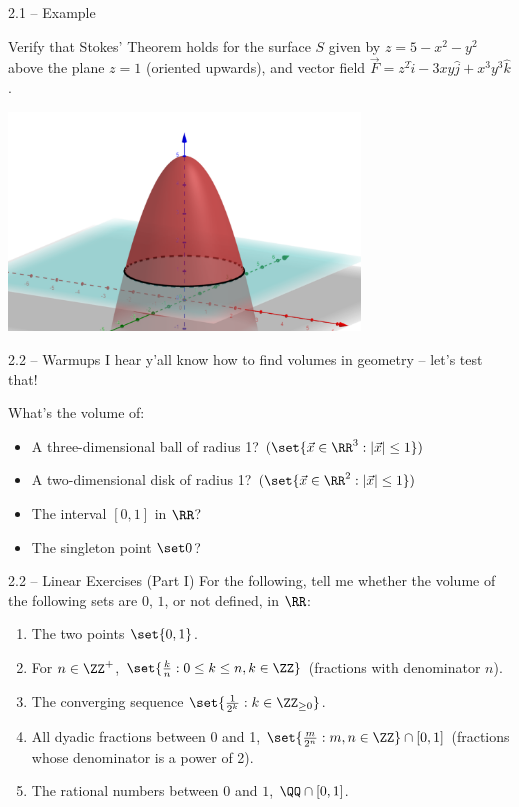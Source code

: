 \documentclass{beamer}
\theoremstyle{plain}
\begin{document}
\begin{frame}{2.1 -- Example}
\begin{problem}
  Verify that Stokes' Theorem holds for the surface $S$ given by $z = 5 - x^2 -
  y^2$ above the plane $z = 1$ (oriented upwards), and vector field $\vec F =
  z^2 \hat i - 3xy \hat j + x^3 y^3 \hat k$. 
\end{problem} 

\begin{center}
  \includegraphics[width=0.7\textwidth]{surface-example.png}
\end{center}
\end{frame}


\begin{frame}{2.2 -- Warmups}
 I hear y'all know how to find volumes in geometry -- let's test that!
 
What's the volume of: 
 \begin{itemize}
\pause
   \item A three-dimensional ball of radius 1? $(\set{\vec
    x \in \RR^3 : |\vec x| \leq 1})$
  \pause
  \item A two-dimensional disk of radius 1? $(\set{\vec x \in \RR^2 : |\vec x|
    \leq 1})$
  \pause
  \item The interval $[0,1]$ in $\RR$?  
  \pause
  \item The singleton point $\set 0$?
 \end{itemize}
\end{frame}

\begin{frame}{2.2 -- Linear Exercises (Part I)}
  For the following, tell me whether the volume of the following sets are $0$,
  $1$, or not defined, in $\RR$: 
  \begin{enumerate}
    \pause
    \item The two points $\set{0, 1}$. 
  \pause
    \item For $n \in \ZZ^+$, $\set{\frac k n : 0 \leq k \leq n, k \in
    \ZZ}$ (fractions with denominator $n$).
\pause
  \item The converging sequence $\set{\frac 1 {2^k} : k \in \ZZ_{\geq 0}}$.
\pause
  \item All dyadic fractions between 0 and 1, $\set{\frac m {2^n} : m, n \in
    \ZZ} \cap [0,1]$ (fractions whose denominator is a power of 2). 
  \pause
  \item The rational numbers between $0$ and $1$, $\QQ \cap [0, 1]$.
  \end{enumerate}
\end{frame}
\end{document}
